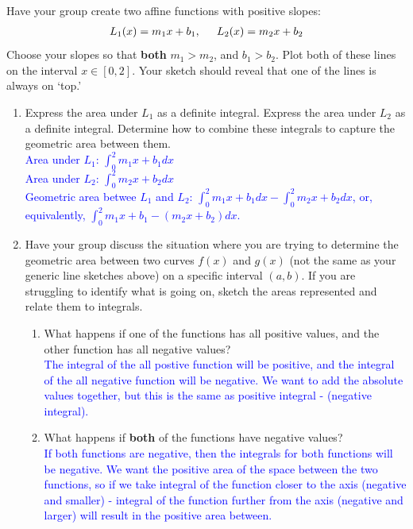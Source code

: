 \documentclass{ximera}
\begin{document}
\begin{exercise}
    Have your group create two affine functions with positive slopes:
    \begin{align}
    	L_{1}(x) = m_{1}x + b_1, \hspace{.2in} L_{2}(x) = m_{2} x + b_2 \nonumber
    \end{align}
    Choose your slopes so that {\bf{both}} $m_{1} >m_2$, and $b_1>b_2$. Plot both of these lines on the interval $x\in [0,2]$. Your sketch should reveal that one of the lines is always on `top.'
    \begin{enumerate}
        \item Express the area under $L_{1}$ as a definite integral. Express the area under $L_2$ as a definite integral. Determine how to combine these integrals to capture the geometric area between them.\\
        \textcolor{blue}{Area under $L_1$: $\int_0^2 m_1 x+b_1dx$\\
        Area under $L_2$: $\int_0^2 m_2 x+b_2dx$\\
        Geometric area betwee $L_1$ and $L_2$: $\int_0^2 m_1 x+b_1dx-\int_0^2 m_2x+b_2dx$, or, equivalently, $\int_0^2 m_1x+b_1-(m_2x+b_2)dx$.}
        \item Have your group discuss the situation where you are trying to determine the geometric area between two curves $f(x)$ and $g(x)$ (not the same as your generic line sketches above) on a specific interval $(a,b)$. If you are struggling to identify what is going on, sketch the areas represented and relate them to integrals.
        \begin{enumerate}
            \item What happens if one of the functions has all positive values, and the other function has all negative values? \\
            \textcolor{blue}{The integral of the all postive function will be positive, and the integral of the all negative function will be negative.  We want to add the absolute values together, but this is the same as positive integral - (negative integral).}
            \item What happens if {\bf{both}} of the functions have negative values?\\
            \textcolor{blue}{If both functions are negative, then the integrals for both functions will be negative.  We want the positive area of the space between the two functions, so if we take integral of the function closer to the axis (negative and smaller) - integral of the function further from the axis (negative and larger) will result in the positive area between. }

\end{enumerate}
\end{enumerate}
\end{exercise}
\end{document}
